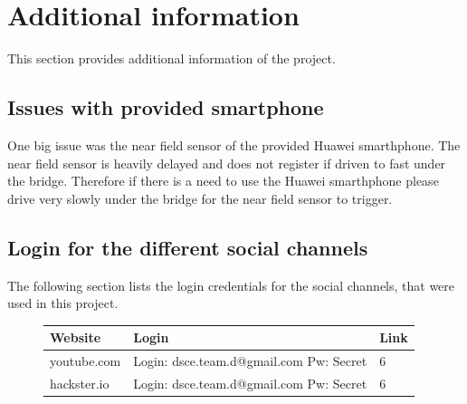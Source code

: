 \section{Additional information}
This section provides additional information of the project. 

\subsection{Issues with provided smartphone}
One big issue was the near field sensor of the provided Huawei smarthphone. The near field sensor is heavily delayed and does not register if driven to fast under the bridge. Therefore if there is a need to use the Huawei smarthphone please drive very slowly under the bridge for the near field sensor to trigger. 

\subsection{Login for the different social channels}
The following section lists the login credentials for the social channels, that were used in this project.
\begin{figure}[H]
	\centering
	\begin{tabular}{ l | p{5.6cm} | l }
		Website & Login & Link \\ \hline
		youtube.com & Login: dsce.team.d@gmail.com Pw: Secret & 6 \\
		hackster.io & Login: dsce.team.d@gmail.com Pw: Secret & 6 \\
	\end{tabular}
\end{figure}

